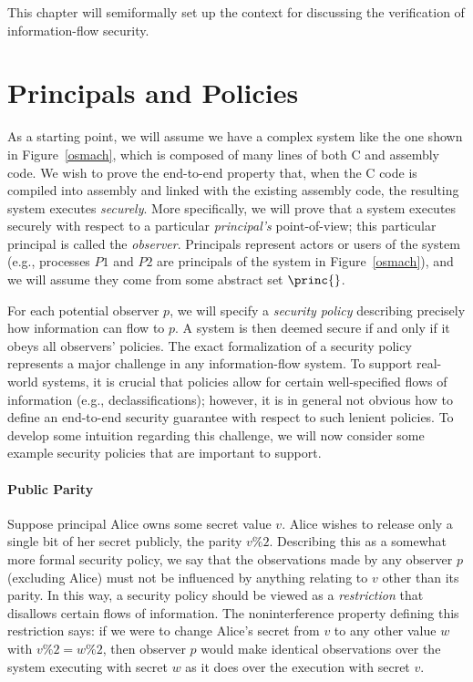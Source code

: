 \label{policies-chapter}
This chapter will semiformally set up the context for discussing the 
verification of information-flow security.

\section{Principals and Policies}
\label{example-policies}

As a starting point, we will assume we have a complex system like the one shown
in Figure~\ref{osmach}, which is composed of many lines of both C and assembly code.
We wish to prove the end-to-end property that, when the C code is compiled into 
assembly and linked with the existing assembly code, the resulting system 
executes \emph{securely}. More specifically, we will prove that a system executes
securely with respect to a particular \emph{principal's} point-of-view; this particular
principal is called the \emph{observer}. Principals
represent actors or users of the system (e.g., processes $P1$ and $P2$ are principals
of the system in Figure~\ref{osmach}), and we will assume they come from some
abstract set $\princ{}$.

For each potential observer $p$, we will specify a \emph{security policy} describing 
precisely how information can flow to $p$. A system is then deemed secure if and only if 
it obeys all observers' policies. The exact formalization of a security policy 
represents a major challenge in any information-flow system. To support real-world
systems, it is crucial that policies allow for certain well-specified flows of 
information (e.g., declassifications); however, it is in general not obvious how
to define an end-to-end security guarantee with respect to such lenient policies.
To develop some intuition regarding this challenge, we will now consider some
example security policies that are important to support.

\paragraph{Public Parity}
Suppose principal Alice owns some secret value $v$. Alice wishes to release
only a single bit of her secret publicly, the parity $v\%2$. Describing this
as a somewhat more formal security policy, we say that the observations made by 
any observer $p$ (excluding Alice) must not be influenced by anything relating 
to $v$ other than its parity. In this way, a security policy should be viewed as
a \emph{restriction} that disallows certain flows of information. The 
noninterference property defining this restriction says: if we were to
change Alice's secret from $v$ to any other value $w$ with $v\%2 = w\%2$,
then observer $p$ would make identical observations over the system executing
with secret $w$ as it does over the execution with secret $v$.

